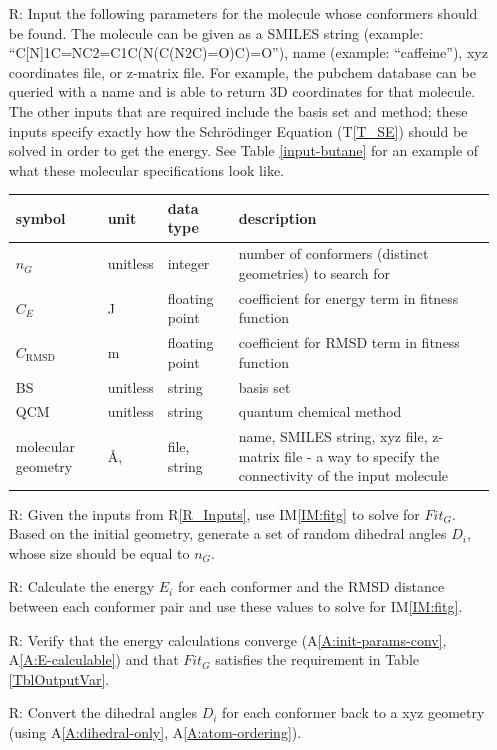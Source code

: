 \documentclass[12pt]{article}
\newcommand{\tref}[1]{T\ref{#1}}
\newcommand{\aref}[1]{A\ref{#1}}
\newcommand{\iref}[1]{IM\ref{#1}}
\newcounter{reqnum} %
\newcommand{\rref}[1]{R\ref{#1}}
\begin{document}
\noindent \begin{itemize}

\item[R\refstepcounter{reqnum}\thereqnum \label{R_Inputs}:] Input the following 
parameters for the molecule whose conformers should be found. The molecule can 
be given as a SMILES string (example: ``C[N]1C=NC2=C1C(N(C(N2C)=O)C)=O''), name 
(example: ``caffeine''), xyz coordinates file, or z-matrix file. For example, 
the pubchem database can be queried with a name and is able to return 3D 
coordinates for that molecule. The other inputs that are required include the 
basis set and method; these inputs specify exactly how the Schr\"{o}dinger 
Equation (\tref{T_SE}) should be solved in order to get the energy. See Table 
\ref{input-butane} for an example of what these molecular specifications look 
like.

\begin{tabularx}{\textwidth}{p{1.7cm}p{2cm}p{2cm}X}
	\toprule
	symbol & unit & data type & description \\
	\midrule
	$n_G$ & unitless & integer & number of conformers (distinct geometries) 
	to search for \\
	$C_E$ & \si{\joule} & floating point & coefficient for energy term in 
	fitness function \\
	$C_\text{RMSD}$ & \si{\metre} & floating point & coefficient for RMSD term 
	in fitness function \\
	BS & unitless & string & basis set \\
	QCM & unitless & string & quantum chemical method \\
	molecular geometry & \si{\angstrom}, \textdegree & file, string & name, 
	SMILES 
	string, xyz file, z-matrix file - a way to specify the connectivity of 
	the input molecule \\
	\bottomrule
\end{tabularx}

\item[R\refstepcounter{reqnum}\thereqnum \label{R_OutputInputs}:] Given the 
inputs from \rref{R_Inputs}, use \iref{IM:fitg} to solve for $Fit_G$. Based on 
the initial geometry, generate a set of random dihedral angles $D_i$, whose 
size should be equal to $n_G$.

\item[R\refstepcounter{reqnum}\thereqnum \label{R_Calculate}:] Calculate the 
energy $E_i$ for each conformer and the RMSD distance between each conformer 
pair and use these values to solve for \iref{IM:fitg}.

\item[R\refstepcounter{reqnum}\thereqnum \label{R_VerifyOutput}:] Verify that 
the energy calculations converge (\aref{A:init-params-conv}, 
\aref{A:E-calculable}) and that $Fit_G$ satisfies 
the requirement in 
Table \ref{TblOutputVar}.

\item[R\refstepcounter{reqnum}\thereqnum \label{R_Output}:] Convert the 
dihedral angles $D_i$ for each conformer back to a xyz geometry (using 
\aref{A:dihedral-only}, \aref{A:atom-ordering}).

\end{itemize}
\end{document}
